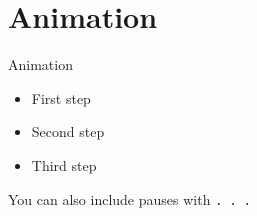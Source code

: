 \documentclass[
  10pt,
  ignorenonframetext,
  aspectratio=169,
]{beamer}
\providecommand{\tightlist}{%
  \setlength{\itemsep}{0pt}\setlength{\parskip}{0pt}}
\begin{document}
\hypertarget{animation}{%
\section{Animation}\label{animation}}

\begin{frame}[fragile]{Animation}

\begin{itemize}[<+->]
\tightlist
\item
  First step
\item
  Second step
\item
  Third step
\end{itemize}

\pause

You can also include pauses with \texttt{.\ .\ .}

\end{frame}
\end{document}
